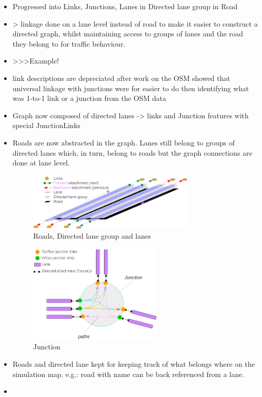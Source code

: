 \begin{itemize}
	\item Progressed into Links, Junctions, Lanes in Directed lane group in Road
	\item > linkage done on a lane level instead of road to make it easier to construct a directed graph, whilst maintaining access to groups of lanes and the road they belong to for traffic behaviour.
	\item >>>Example!
	\item link descriptions are depreciated after work on the OSM showed that universal linkage with junctions were for easier to do then identifying what was 1-to-1 link or a junction from the OSM data
	\item Graph now composed of directed lanes -> links and Junction features with special JunctionLinks
	\item Roads are now abstracted in the graph. Lanes still belong to groups of directed lanes which, in turn, belong to roads but the graph connections are done at lane level.
	
\begin{figure}[h]
	\vspace{1.5em}
  	\caption{Roads, Directed lane group and lanes}
  	\label{fig:RoadsFinal}
  	\centering
	\includegraphics[width=0.75\textwidth]{figs/graphConstruction/Roads.png}
  	\vspace{1.5em}
\end{figure}	
	
\begin{figure}[h]
	\vspace{1.5em}
  	\caption{Junction}
  	\label{fig:junction}
  	\centering
	\includegraphics[width=0.6\textwidth]{figs/graphConstruction/Junction.png}
  	\vspace{1.5em}
\end{figure}
	
	\item Roads and directed lane kept for keeping track of what belongs where on the simulation map. e.g.: road with name can be back referenced from a lane.
	\item 
\end{itemize}

